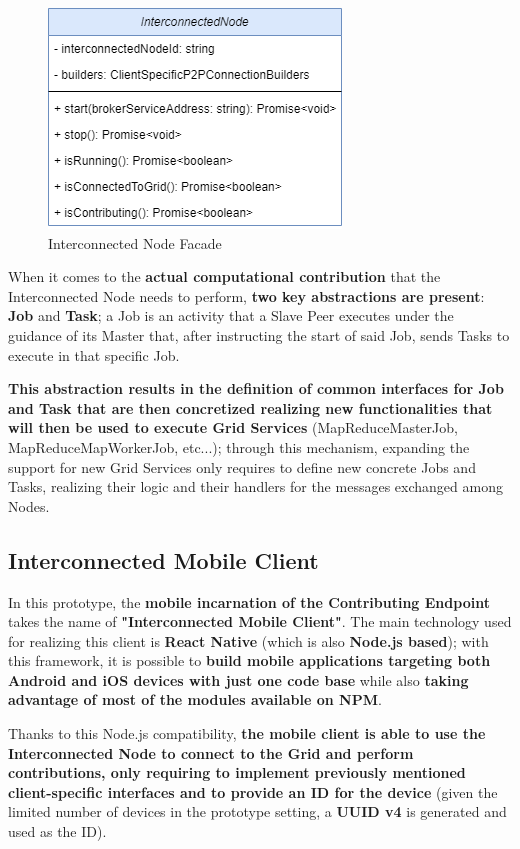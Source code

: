 \begin{figure}[!ht]
    \centering
    \includegraphics[scale=0.6]{document/chapters/chapter_6/images/interconnected_node_facade.png}
    \caption{Interconnected Node Facade}
    \label{fig:interconnected_node_facade}
\end{figure}

When it comes to the \textbf{actual computational contribution} that the Interconnected Node needs to perform, \textbf{two key abstractions are present}: \textbf{Job} and \textbf{Task}; a Job is an activity that a Slave Peer executes under the guidance of its Master that, after instructing the start of said Job, sends Tasks to execute in that specific Job.

\textbf{This abstraction results in the definition of common interfaces for Job and Task that are then concretized realizing new functionalities that will then be used to execute Grid Services} (MapReduceMasterJob, MapReduceMapWorkerJob, etc...); through this mechanism, expanding the support for new Grid Services only requires to define new concrete Jobs and Tasks, realizing their logic and their handlers for the messages exchanged among Nodes.

\subsection{Interconnected Mobile Client}
In this prototype, the \textbf{mobile incarnation of the Contributing Endpoint} takes the name of \textbf{"Interconnected Mobile Client"}. The main technology used for realizing this client is \textbf{React Native} (which is also \textbf{Node.js based}); with this framework, it is possible to \textbf{build mobile applications targeting both Android and iOS devices with just one code base} while also \textbf{taking advantage of most of the modules available on NPM}.

Thanks to this Node.js compatibility, \textbf{the mobile client is able to use the Interconnected Node to connect to the Grid and perform contributions, only requiring to implement previously mentioned client-specific interfaces and to provide an ID for the device} (given the limited number of devices in the prototype setting, a \textbf{UUID v4} is generated and used as the ID).

